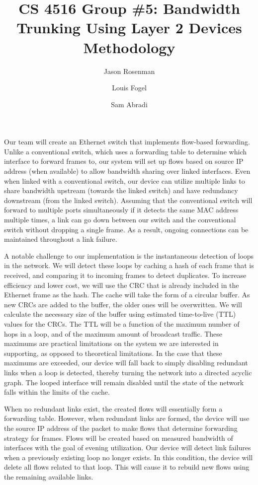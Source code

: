 \documentclass{article}
\title{CS 4516 Group \#5: Bandwidth Trunking Using Layer 2 Devices\\Methodology}
\author{Jason Rosenman \and Louis Fogel \and Sam Abradi}
\date{}
\begin{document}
\maketitle
	Our team will create an Ethernet switch that implements flow-based forwarding.
	Unlike a conventional switch, which uses a forwarding table to determine which interface to forward frames to, our system will set up flows based on source IP address (when available) to allow bandwidth sharing over linked interfaces.
	Even when linked with a conventional switch, our device can utilize multiple links to share bandwidth upstream (towards the linked switch) and have redundancy downstream (from the linked switch).
	Assuming that the conventional switch will forward to multiple ports simultaneously if it detects the same MAC address multiple times, a link can go down between our switch and the conventional switch without dropping a single frame.
	As a result, ongoing connections can be maintained throughout a link failure.

	A notable challenge to our implementation is the instantaneous detection of loops in the network.
	We will detect these loops by caching a hash of each frame that is received, and comparing it to incoming frames to detect duplicates.
	To increase efficiency and lower cost, we will use the CRC that is already included in the Ethernet frame as the hash.
	The cache will take the form of a circular buffer.
	As new CRCs are added to the buffer, the older ones will be overwritten.
	We will calculate the necessary size of the buffer using estimated time-to-live (TTL) values for the CRCs.
	The TTL will be a function of the maximum number of hops in a loop, and of the maximum amount of broadcast traffic.
	These maximums are practical limitations on the system we are interested in supporting, as opposed to theoretical limitations.
	In the case that these maximums are exceeded, our device will fall back to simply disabling redundant links when a loop is detected, thereby turning the network into a directed acyclic graph.
	The looped interface will remain disabled until the state of the network falls within the limits of the cache.
	
	When no redundant links exist, the created flows will essentially form a forwarding table.
	However, when redundant links are formed, the device will use the source IP address of the packet to make flows that determine forwarding strategy for frames.
	Flows will be created based on measured bandwidth of interfaces with the goal of evening utilization.
	Our device will detect link failures when a previously existing loop no longer exists.
	In this condition, the device will delete all flows related to that loop.
	This will cause it to rebuild new flows using the remaining available links.
\end{document}
